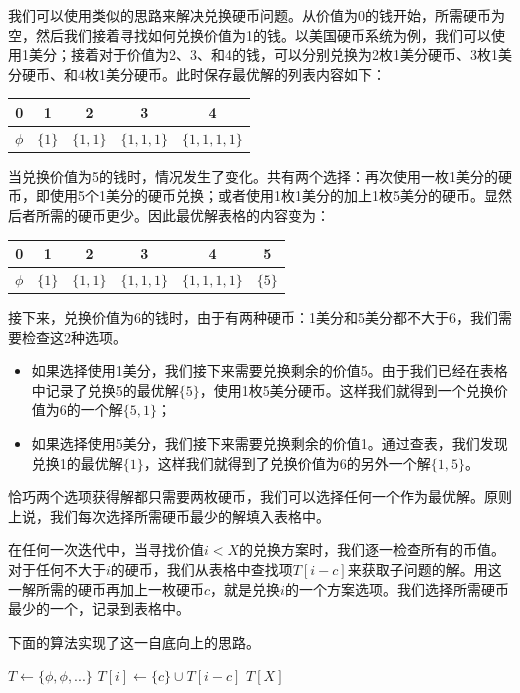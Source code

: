 \documentclass[UTF8]{article}
\begin{document}
我们可以使用类似的思路来解决兑换硬币问题。从价值为0的钱开始，所需硬币为空，然后我们接着寻找如何兑换价值为1的钱。以美国硬币系统为例，我们可以使用1美分；接着对于价值为2、3、和4的钱，可以分别兑换为2枚1美分硬币、3枚1美分硬币、和4枚1美分硬币。此时保存最优解的列表内容如下：

\begin{tabular}{|c|c|c|c|c|}
\hline
0 & 1 & 2 & 3 & 4 \\
\hline
$\phi$ & $\{1\}$ & $\{1, 1\}$ & $\{1, 1, 1\}$ & $\{1, 1, 1, 1\}$ \\
\hline
\end{tabular}

当兑换价值为5的钱时，情况发生了变化。共有两个选择：再次使用一枚1美分的硬币，即使用5个1美分的硬币兑换；或者使用1枚1美分的加上1枚5美分的硬币。显然后者所需的硬币更少。因此最优解表格的内容变为：

\begin{tabular}{|c|c|c|c|c|c|}
\hline
0 & 1 & 2 & 3 & 4 & 5 \\
\hline
$\phi$ & $\{1\}$ & $\{1, 1\}$ & $\{1, 1, 1\}$ & $\{1, 1, 1, 1\}$ & $\{ 5 \}$ \\
\hline
\end{tabular}

接下来，兑换价值为6的钱时，由于有两种硬币：1美分和5美分都不大于6，我们需要检查这2种选项。

\begin{itemize}
\item 如果选择使用1美分，我们接下来需要兑换剩余的价值5。由于我们已经在表格中记录了兑换5的最优解$\{ 5 \}$，使用1枚5美分硬币。这样我们就得到一个兑换价值为6的一个解$\{5, 1\}$；
\item 如果选择使用5美分，我们接下来需要兑换剩余的价值1。通过查表，我们发现兑换1的最优解$\{ 1 \}$，这样我们就得到了兑换价值为6的另外一个解$\{1, 5\}$。
\end{itemize}

恰巧两个选项获得解都只需要两枚硬币，我们可以选择任何一个作为最优解。原则上说，我们每次选择所需硬币最少的解填入表格中。

在任何一次迭代中，当寻找价值$i < X$的兑换方案时，我们逐一检查所有的币值。对于任何不大于$i$的硬币，我们从表格中查找项$T[i-c]$来获取子问题的解。用这一解所需的硬币再加上一枚硬币$c$，就是兑换$i$的一个方案选项。我们选择所需硬币最少的一个，记录到表格中。

下面的算法实现了这一自底向上的思路。

\begin{algorithmic}[1]
  \State $T \gets \{ \phi, \phi, ... \}$
        \State $T[i] \gets \{ c \} \cup T[i-c]$
      \EndIf
    \EndFor
  \EndFor
  \State \Return $T[X]$
\EndFunction
\end{algorithmic}
\end{document}
